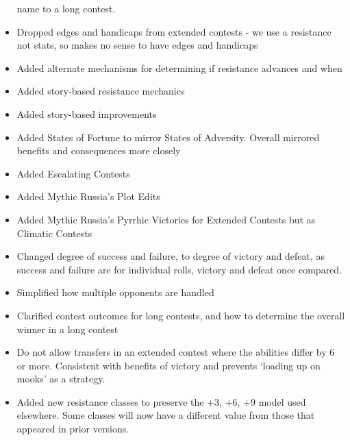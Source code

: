 \documentclass[
]{article}
\begin{document}
\begin{itemize}
  name to a long contest.
\item
  Dropped edges and handicaps from extended contests - we use a
  resistance not stats, so makes no sense to have edges and handicaps
\item
  Added alternate mechanisms for determining if resistance advances and
  when
\item
  Added story-based resistance mechanics
\item
  Added story-based improvements
\item
  Added States of Fortune to mirror States of Adversity. Overall
  mirrored benefits and consequences more closely
\item
  Added Escalating Contests
\item
  Added Mythic Russia's Plot Edits
\item
  Added Mythic Russia's Pyrrhic Victories for Extended Contests but as
  Climatic Contests
\item
  Changed degree of success and failure, to degree of victory and
  defeat, as success and failure are for individual rolls, victory and
  defeat once compared.
\item
  Simplified how multiple opponents are handled
\item
  Clarified contest outcomes for long contests, and how to determine the
  overall winner in a long contest
\item
  Do not allow transfers in an extended contest where the abilities
  differ by 6 or more. Consistent with benefits of victory and prevents
  `loading up on mooks' as a strategy.
\item
  Added new resistance classes to preserve the +3, +6, +9 model used
  elsewhere. Some classes will now have a different value from those
  that appeared in prior versions.
\end{itemize}
\end{document}
